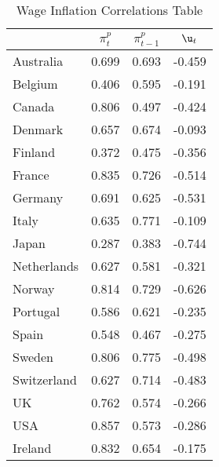\begin{table}[htbp]
\caption{\label{clabel} Wage Inflation Correlations Table}\centering\medskip
\begin{tabular}{lccc} \hline \hline
 & $\pi_t^p$  & $\pi_{t-1}^p$  & $\u_t$  \\  \hline 
Australia &     0.699 &     0.693 &    -0.459 \\  
Belgium &     0.406 &     0.595 &    -0.191 \\  
Canada &     0.806 &     0.497 &    -0.424 \\  
Denmark &     0.657 &     0.674 &    -0.093 \\  
Finland &     0.372 &     0.475 &    -0.356 \\  
France &     0.835 &     0.726 &    -0.514 \\  
Germany &     0.691 &     0.625 &    -0.531 \\  
Italy &     0.635 &     0.771 &    -0.109 \\  
Japan &     0.287 &     0.383 &    -0.744 \\  
Netherlands &     0.627 &     0.581 &    -0.321 \\  
Norway &     0.814 &     0.729 &    -0.626 \\  
Portugal &     0.586 &     0.621 &    -0.235 \\  
Spain &     0.548 &     0.467 &    -0.275 \\  
Sweden &     0.806 &     0.775 &    -0.498 \\  
Switzerland &     0.627 &     0.714 &    -0.483 \\  
UK &     0.762 &     0.574 &    -0.266 \\  
USA &     0.857 &     0.573 &    -0.286 \\  
Ireland &     0.832 &     0.654 &    -0.175 \\  
\hline \hline \end{tabular}
\end{table}
